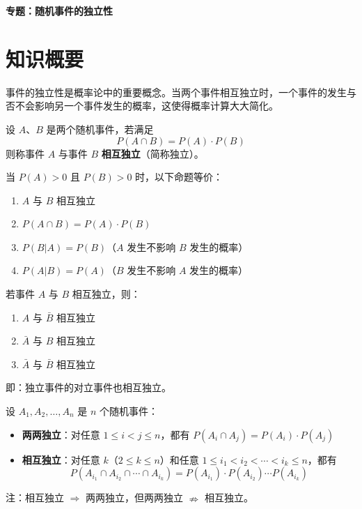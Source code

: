 \documentclass[11pt]{ctexrep}
\begin{document}
\begin{center}
    {\LARGE\bfseries 专题：随机事件的独立性}
\end{center}

\section*{知识概要}

事件的独立性是概率论中的重要概念。当两个事件相互独立时，一个事件的发生与否不会影响另一个事件发生的概率，这使得概率计算大大简化。

\begin{definition}[独立事件]
    设 $A$、$B$ 是两个随机事件，若满足
    \[
        P(A \cap B) = P(A) \cdot P(B)
    \]
    则称事件 $A$ 与事件 $B$ \textbf{相互独立}（简称独立）。
\end{definition}

\begin{property}[独立事件的等价条件]
    当 $P(A) > 0$ 且 $P(B) > 0$ 时，以下命题等价：
    \begin{enumerate}
        \item $A$ 与 $B$ 相互独立
        \item $P(A \cap B) = P(A) \cdot P(B)$
        \item $P(B|A) = P(B)$（$A$ 发生不影响 $B$ 发生的概率）
        \item $P(A|B) = P(A)$（$B$ 发生不影响 $A$ 发生的概率）
    \end{enumerate}
\end{property}

\begin{property}[独立事件的性质]
    若事件 $A$ 与 $B$ 相互独立，则：
    \begin{enumerate}
        \item $A$ 与 $\bar{B}$ 相互独立
        \item $\bar{A}$ 与 $B$ 相互独立
        \item $\bar{A}$ 与 $\bar{B}$ 相互独立
    \end{enumerate}
    即：独立事件的对立事件也相互独立。
\end{property}

\begin{definition}[多个事件的独立性]
    设 $A_1, A_2, \ldots, A_n$ 是 $n$ 个随机事件：
    \begin{itemize}
        \item \textbf{两两独立}：对任意 $1 \leq i < j \leq n$，都有 $P(A_i \cap A_j) = P(A_i) \cdot P(A_j)$
        \item \textbf{相互独立}：对任意 $k$（$2 \leq k \leq n$）和任意 $1 \leq i_1 < i_2 < \cdots < i_k \leq n$，都有
        \[
            P(A_{i_1} \cap A_{i_2} \cap \cdots \cap A_{i_k}) = P(A_{i_1}) \cdot P(A_{i_2}) \cdots P(A_{i_k})
        \]
    \end{itemize}
    注：相互独立 $\Rightarrow$ 两两独立，但两两独立 $\nRightarrow$ 相互独立。
\end{definition}
\end{document}
